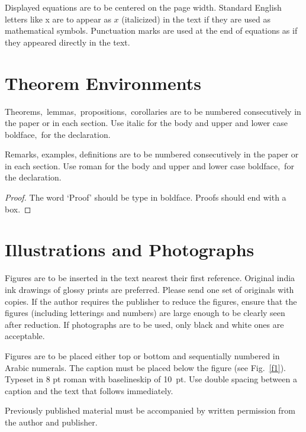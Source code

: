 \documentclass{ws-ijmpd}
\begin{document}
Displayed equations are to be centered on the page width.
Standard English letters like x are to appear as $x$
(italicized) in the text if they are used as mathematical
symbols. Punctuation marks are used at the end of equations as
if they appeared directly in the text.

\section{Theorem Environments}

\begin{theorem}
Theorems$,$ lemmas$,$ propositions$,$ corollaries are to be numbered
consecutively in the paper or in each section. Use italic for the
body and upper and lower case boldface$,$ for the declaration.
\end{theorem}

\begin{remark}
Remarks, examples, definitions are to be numbered
consecutively in the paper or in each section. Use roman for the
body and upper and lower case boldface$,$ for the declaration.
\end{remark}

\begin{proof}
The word `Proof' should be type in boldface. Proofs
should end with\break
a box.
\end{proof}

\section{Illustrations and Photographs}

Figures are to be inserted in the text nearest their first
reference.  Original india ink drawings of glossy prints are
preferred. Please send one set of originals with copies. If the
author requires the publisher to reduce the figures, ensure that
the figures (including letterings and numbers) are large enough
to be clearly seen after reduction. If photographs are to be
used, only black and white ones are acceptable.

Figures are to be placed either top or bottom and sequentially
numbered in Arabic numerals. The caption must be placed below the
figure (see Fig.~\ref{f1}). Typeset in 8 pt roman with baselineskip of
10~pt. Use double spacing between a caption and the text that follows
immediately.

Previously published material must be accompanied by written
permission from the author and publisher.
\end{document}
